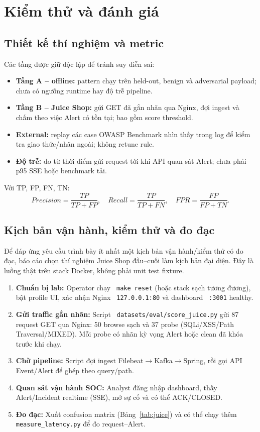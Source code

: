 \documentclass[runningheads]{report-template/llncs}
\newcommand{\code}[1]{\texttt{\small\hyphenchar\font=45 #1}}
\begin{document}
\section{Kiểm thử và đánh giá}

\subsection{Thiết kế thí nghiệm và metric}

Các tầng được giữ độc lập để tránh suy diễn sai:
\begin{itemize}
  \item \textbf{Tầng A -- offline:} pattern chạy trên held-out, benign và
  adversarial payload; chưa có ngưỡng runtime hay độ trễ pipeline.
  \item \textbf{Tầng B -- Juice Shop:} gửi GET đã gắn nhãn qua Nginx,
  đợi ingest và chấm theo việc Alert có tồn tại; bao gồm score threshold.
  \item \textbf{External:} replay các case OWASP Benchmark nhìn thấy
  trong log để kiểm tra giao thức/nhãn ngoài; không retune rule.
  \item \textbf{Độ trễ:} đo từ thời điểm gửi request tới khi API quan sát
  Alert; chưa phải p95 SSE hoặc benchmark tải.
\end{itemize}

Với TP, FP, FN, TN:
\[
 Precision=\frac{TP}{TP+FP},\quad
 Recall=\frac{TP}{TP+FN},\quad
 FPR=\frac{FP}{FP+TN}.
\]

\subsection{Kịch bản vận hành, kiểm thử và đo đạc}

Để đáp ứng yêu cầu trình bày ít nhất một kịch bản vận hành/kiểm thử có
đo đạc, báo cáo chọn thí nghiệm Juice Shop đầu--cuối làm kịch bản đại
diện. Đây là luồng thật trên stack Docker, không phải unit test fixture.

\begin{enumerate}
  \item \textbf{Chuẩn bị lab:} Operator chạy \code{make reset} (hoặc
  stack sạch tương đương), bật profile UI, xác nhận Nginx
  \code{127.0.0.1:80} và dashboard \code{:3001} healthy.
  \item \textbf{Gửi traffic gắn nhãn:} Script
  \code{datasets/eval/score\_juice.py} gửi 87 request GET qua Nginx: 50
  browse sạch và 37 probe (SQLi/XSS/Path Traversal/MIXED). Mỗi probe có
  nhãn kỳ vọng Alert hoặc clean đã khóa trước khi chạy.
  \item \textbf{Chờ pipeline:} Script đợi ingest
  Filebeat$\rightarrow$Kafka$\rightarrow$Spring, rồi gọi API Event/Alert
  để ghép theo query/path.
  \item \textbf{Quan sát vận hành SOC:} Analyst đăng nhập dashboard, thấy
  Alert/Incident realtime (SSE), mở sự cố và có thể ACK/CLOSED.
  \item \textbf{Đo đạc:} Xuất confusion matrix (Bảng~\ref{tab:juice}) và
  có thể chạy thêm \code{measure\_latency.py} để đo request--Alert.
\end{enumerate}
\end{document}
